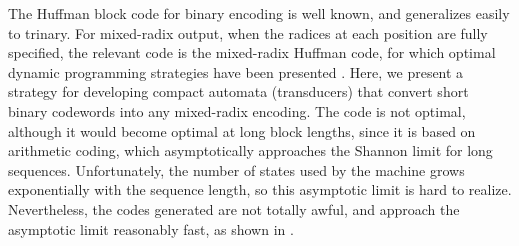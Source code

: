 \documentclass[english]{article}
\begin{document}
The Huffman block code for binary encoding is well known, and generalizes easily to trinary.
For mixed-radix output, when the radices at each position are fully specified,
the relevant code is the mixed-radix Huffman code, for which optimal dynamic programming strategies have been presented \cite{ChuGill1992,GolinEtAl2009}.
Here, we present a strategy for developing compact automata (transducers) that convert short binary codewords into any mixed-radix encoding.
The code is not optimal, although it would become optimal at long block lengths,
since it is based on arithmetic coding, which asymptotically approaches the Shannon limit for long sequences.
Unfortunately, the number of states used by the machine grows exponentially with the sequence length, so this asymptotic limit is hard to realize.
Nevertheless, the codes generated are not totally awful, and approach the asymptotic limit reasonably fast,
as shown in .
\end{document}
